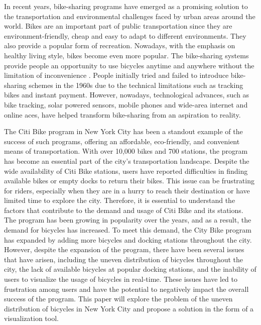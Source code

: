 \documentclass[journal]{vgtc}                     %
\begin{document}
In recent years, bike-sharing programs have emerged as a promising solution to the transportation and environmental challenges faced by urban areas around the world. Bikes are an important part of public transportation since they are environment-friendly, cheap and easy to adapt to different environments. They also provide a popular form of recreation. Nowadays, with the emphasis on healthy living style, bikes become even more popular. The bike-sharing systems provide people an opportunity to use bicycles anytime and anywhere without the limitation of inconvenience \cite{Parkes et al.}. People initially tried and failed to introduce bike-sharing schemes in the 1960s due to the technical limitations such as tracking bikes and instant payment. However, nowadays, technological advances, such as bike tracking, solar powered sensors, mobile phones and wide-area internet and online aces, have helped transform bike-sharing from an aspiration to reality. \cite{lamport94}

The Citi Bike program in New York City has been a standout example of the success of such programs, offering an affordable, eco-friendly, and convenient means of transportation. With over 10,000 bikes and 700 stations, the program has become an essential part of the city's transportation landscape. Despite the wide availability of Citi Bike stations, users have reported difficulties in finding available bikes or empty docks to return their bikes.\cite{Faghih-imani} This issue can be frustrating for riders, especially when they are in a hurry to reach their destination or have limited time to explore the city. Therefore, it is essential to understand the factors that contribute to the demand and usage of Citi Bike and its stations. The program has been growing in popularity over the years, and as a result, the demand for bicycles has increased. To meet this demand, the City Bike program has expanded by adding more bicycles and docking stations throughout the city. However, despite the expansion of the program, there have been several issues that have arisen, including the uneven distribution of bicycles throughout the city, the lack of available bicycles at popular docking stations, and the inability of users to visualize the usage of bicycles in real-time. These issues have led to frustration among users and have the potential to negatively impact the overall success of the program.\cite{Goodman A} This paper will explore the problem of the uneven distribution of bicycles in New York City and propose a solution in the form of a visualization tool.
\end{document}
